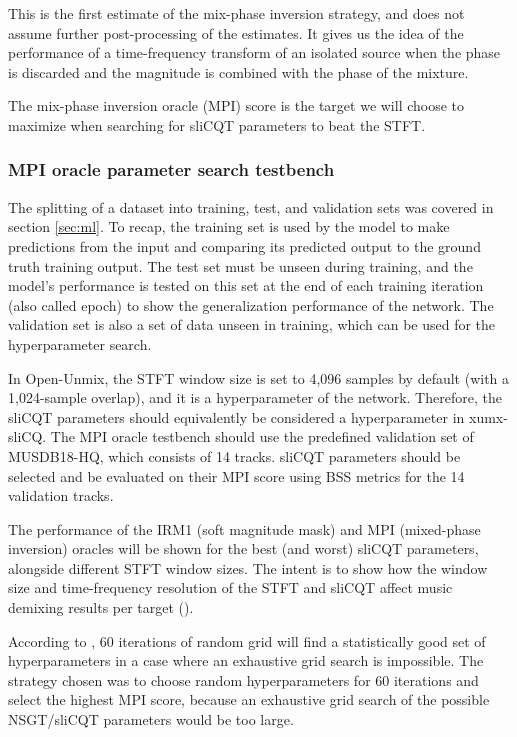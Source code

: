 \documentclass[report.tex]{subfiles}
\begin{document}
This is the first estimate of the mix-phase inversion strategy, and does not assume further post-processing of the estimates. It gives us the idea of the performance of a time-frequency transform of an isolated source when the phase is discarded and the magnitude is combined with the phase of the mixture.

The mix-phase inversion oracle (MPI) score is the target we will choose to maximize when searching for sliCQT parameters to beat the STFT.

\subsubsection{MPI oracle parameter search testbench}
\label{sec:mpiparam}

The splitting of a dataset into training, test, and validation sets was covered in section \ref{sec:ml}. To recap, the training set is used by the model to make predictions from the input and comparing its predicted output to the ground truth training output. The test set must be unseen during training, and the model's performance is tested on this set at the end of each training iteration (also called epoch) to show the generalization performance of the network. The validation set is also a set of data unseen in training, which can be used for the hyperparameter search.

In Open-Unmix, the STFT window size is set to 4,096 samples by default (with a 1,024-sample overlap), and it is a hyperparameter of the network. Therefore, the sliCQT parameters should equivalently be considered a hyperparameter in xumx-sliCQ. The MPI oracle testbench should use the predefined validation set of MUSDB18-HQ, which consists of 14 tracks. sliCQT parameters should be selected and be evaluated on their MPI score using BSS metrics for the 14 validation tracks.

The performance of the IRM1 (soft magnitude mask) and MPI (mixed-phase inversion) oracles will be shown for the best (and worst) sliCQT parameters, alongside different STFT window sizes. The intent is to show how the window size and time-frequency resolution of the STFT and sliCQT affect music demixing results per target (\cite{tftradeoff1}).

According to \textcite{randomgrid}, 60 iterations of random grid will find a statistically good set of hyperparameters in a case where an exhaustive grid search is impossible. The strategy chosen was to choose random hyperparameters for 60 iterations and select the highest MPI score, because an exhaustive grid search of the possible NSGT/sliCQT parameters would be too large. 
\end{document}

